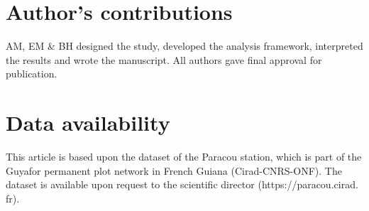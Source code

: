 \documentclass[fleqn,10pt]{ArtEcoFoG} %
\begin{document}
\section{Author's contributions}\label{authors-contributions}

AM, EM \& BH designed the study, developed the analysis framework,
interpreted the results and wrote the manuscript. All authors gave final
approval for publication.

\section{Data availability}\label{data-availability}

This article is based upon the dataset of the Paracou station, which is
part of the Guyafor permanent plot network in French Guiana
(Cirad-CNRS-ONF). The dataset is available upon request to the
scientific director (https://paracou.cirad. fr).



\makeatletter

\makeatother


\end{document}
